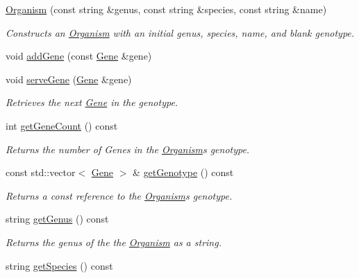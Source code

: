 \begin{DoxyCompactItemize}
\item 
\hyperlink{class_organism_a4e5d98843608364964a6616e630f9c3b}{Organism} (const string \&genus, const string \&species, const string \&name)
\begin{DoxyCompactList}\small\item\em Constructs an \hyperlink{class_organism}{Organism} with an initial genus, species, name, and blank genotype. \end{DoxyCompactList}\item 
void \hyperlink{class_organism_a3dd60a8f90366cd02ba10e32bc2aae3c}{add\+Gene} (const \hyperlink{class_gene}{Gene} \&gene)
\item 
void \hyperlink{class_organism_aa6d906d352590a2f26f40bd953245e98}{serve\+Gene} (\hyperlink{class_gene}{Gene} \&gene)
\begin{DoxyCompactList}\small\item\em Retrieves the next \hyperlink{class_gene}{Gene} in the genotype. \end{DoxyCompactList}\item 
int \hyperlink{class_organism_a9719a5a125a051c2fadffe6f4d9a8bb8}{get\+Gene\+Count} () const \hypertarget{class_organism_a9719a5a125a051c2fadffe6f4d9a8bb8}{}\label{class_organism_a9719a5a125a051c2fadffe6f4d9a8bb8}

\begin{DoxyCompactList}\small\item\em Returns the number of Genes in the \hyperlink{class_organism}{Organism}\textquotesingle{}s genotype. \end{DoxyCompactList}\item 
const std\+::vector$<$ \hyperlink{class_gene}{Gene} $>$ \& \hyperlink{class_organism_a1744d697440baff0a30a9eded7322f2a}{get\+Genotype} () const \hypertarget{class_organism_a1744d697440baff0a30a9eded7322f2a}{}\label{class_organism_a1744d697440baff0a30a9eded7322f2a}

\begin{DoxyCompactList}\small\item\em Returns a const reference to the \hyperlink{class_organism}{Organism}\textquotesingle{}s genotype. \end{DoxyCompactList}\item 
string \hyperlink{class_organism_a7e6b427ff537967ae93bf1ee3a4adbfe}{get\+Genus} () const \hypertarget{class_organism_a7e6b427ff537967ae93bf1ee3a4adbfe}{}\label{class_organism_a7e6b427ff537967ae93bf1ee3a4adbfe}

\begin{DoxyCompactList}\small\item\em Returns the genus of the the \hyperlink{class_organism}{Organism} as a string. \end{DoxyCompactList}\item 
string \hyperlink{class_organism_a7d7d392b253bfacf2e13855de9b7312a}{get\+Species} () const \hypertarget{class_organism_a7d7d392b253bfacf2e13855de9b7312a}{}\label{class_organism_a7d7d392b253bfacf2e13855de9b7312a}


\end{DoxyCompactItemize}
